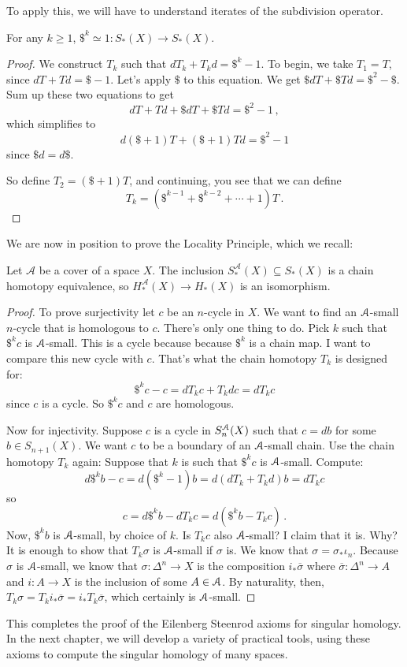 To apply this, we will have to understand iterates of the subdivision operator.

\begin{lemma} For any $k\geq1$,
$\$^k\simeq 1:S_\ast(X)\to S_\ast(X)$.
\end{lemma}
\begin{proof}
We construct $T_k$ such that $dT_k+T_kd=\$^k-1$. To begin, we take $T_1=T$, since $dT+Td=\$-1$. Let's apply $\$$ to this equation. We get $\$dT+\$Td=\$^2-\$$. Sum up these two equations to get 
\[
dT+Td+\$dT+\$Td = \$^2-1\,,
\] 
which simplifies to 
\[
d(\$+1)T+(\$+1)Td=\$^2-1
\]
since $\$d=d\$$.

So define $T_2=(\$+1)T$, and continuing, you see that we can define
\[
T_k=(\$^{k-1}+\$^{k-2}+\cdots+1)T\,.
\]
\end{proof}

We are now in position to prove the Locality Principle, which we recall:
\begin{theorem}
Let $\mathscr{A}$ be a cover of a space $X$. 
The inclusion $S^\mathscr{A}_\ast(X)\subseteq S_\ast(X)$ is a chain homotopy equivalence, so $H^\mathscr{A}_\ast(X)\to H_\ast(X)$ is an isomorphism.
\end{theorem}
\begin{proof}
To prove surjectivity let $c$ be an $n$-cycle in $X$. We want to find an $\mathcal{A}$-small $n$-cycle that is homologous to $c$. There's only one thing to do. Pick $k$ such that $\$^k c$ is $\mathcal{A}$-small. This is a cycle because because $\$^k$ is a chain map. I want to compare this new cycle with $c$. That's what the chain homotopy $T_k$ is designed for: 
\[
\$^kc-c=dT_k c+T_kdc=dT_kc
\]
since $c$ is a cycle. So $\$^kc$ and $c$ are homologous.

Now for injectivity. Suppose $c$ is a cycle in $S^{\mathcal{A}}_n(X)$ such that $c=db$ for some $b\in S_{n+1}(X)$. We want $c$ to be a boundary of an $\mathcal{A}$-small chain. Use the chain homotopy $T_k$ again: Suppose that $k$ is such that $\$^kc$ is $\mathcal{A}$-small. Compute:
\[
d\$^kb-c=d(\$^k-1)b=d(dT_k+T_kd)b=dT_kc
\]
so 
\[
c=d\$^kb-dT_kc=d(\$^kb-T_kc)\,.
\]
Now, $\$^kb$ is $\mathcal{A}$-small, by choice of $k$. Is $T_kc$ also $\mathcal{A}$-small? I claim that it is. Why? It is enough to show that $T_k\sigma$ is $\mathcal{A}$-small if $\sigma$ is. We know that $\sigma=\sigma_\ast\iota_n$. Because $\sigma$ is $\mathcal{A}$-small, we know that $\sigma:\Delta^n\to X$ is the composition $i_\ast\overline{\sigma}$ where $\overline{\sigma}:\Delta^n\to A$ and $i:A\to X$ is the inclusion of some $A\in\mathcal{A}$. By naturality, then, $T_k\sigma=T_ki_\ast\overline{\sigma}=i_\ast T_k\overline{\sigma}$, which certainly is $\mathcal{A}$-small.
\end{proof}

This completes the proof of the Eilenberg Steenrod axioms for singular homology. In the next chapter, we will develop a variety of practical tools, using these axioms to compute the singular homology of many spaces. 
